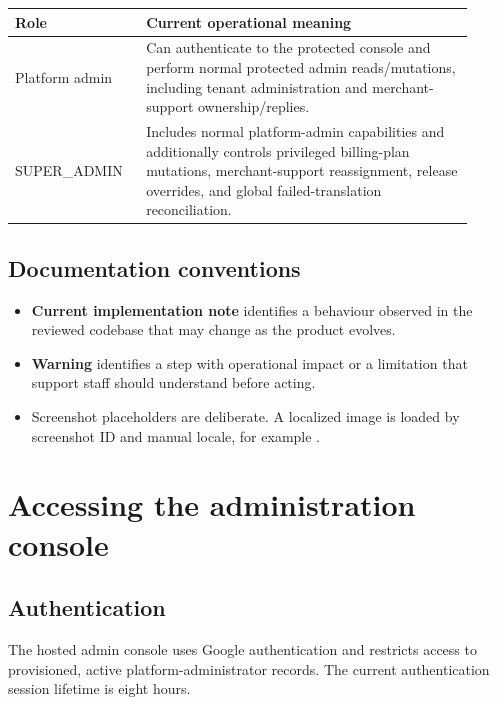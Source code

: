 \begin{longtable}{P{0.25\linewidth}P{0.66\linewidth}}
\toprule
\textbf{Role} & \textbf{Current operational meaning}\\
\midrule
\endhead
Platform admin & Can authenticate to the protected console and perform normal protected admin reads/mutations, including tenant administration and merchant-support ownership/replies.\\
SUPER\_ADMIN & Includes normal platform-admin capabilities and additionally controls privileged billing-plan mutations, merchant-support reassignment, release overrides, and global failed-translation reconciliation.\\
\bottomrule
\end{longtable}


\section{Documentation conventions}
\begin{itemize}
  \item \textbf{Current implementation note} identifies a behaviour observed in the reviewed codebase that may change as the product evolves.
  \item \textbf{Warning} identifies a step with operational impact or a limitation that support staff should understand before acting.
  \item Screenshot placeholders are deliberate. A localized image is loaded by screenshot ID and manual locale, for example .
\end{itemize}

\chapter{Accessing the administration console}

\section{Authentication}
The hosted admin console uses Google authentication and restricts access to provisioned, active platform-administrator records. The current authentication session lifetime is eight hours.

